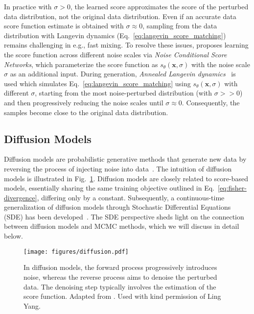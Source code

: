 In practice with $\sigma > 0$, the learned score approximates the score of the perturbed data distribution, not the original data distribution. Even if an accurate data score function estimate is obtained with $\sigma \approx 0$, sampling from the data distribution with Langevin dynamics (Eq.~\eqref{eq:langevin_score_matching}) remains challenging in e.g., fast mixing. To resolve these issues, \citet{song2019generative} proposes learning the score function across different noise scales via \emph{Noise Conditional Score Networks}, which parameterize the score function as $s_{\theta}(\bm{x},\sigma)$ with the noise scale $\sigma$ as an additional input. During generation, 
\emph{Annealed Langevin dynamics}~\citep{song2019generative} is used which simulates Eq.~\eqref{eq:langevin_score_matching} using $s_{\theta}(\bm{x},\sigma)$ with different $\sigma$, starting from the most noise-perturbed distribution (with $\sigma >> 0$) and then progressively reducing the noise scales until $\sigma \approx 0$. Consequently, the samples become close to the original data distribution.


\subsection{Diffusion Models}
\label{sec:dgm_ddpm}
Diffusion models are probabilistic generative methods that generate new data by reversing the process of injecting noise into data~\citep{sohl2015deep,ho2020denoising}.
The intuition of diffusion models is illustrated in Fig.~\ref{fig:diffusion}.
Diffusion models are closely related to score-based models, essentially sharing the same training objective outlined in Eq.~\eqref{eq:fisher-divergence}, differing only by a constant. Subsequently, a continuous-time generalization of diffusion models through Stochastic Differential Equations (SDE) has been developed~\citep{song2020score}. The SDE perspective sheds light on the connection between diffusion models and MCMC methods, which we will discuss in detail below.   

\begin{figure}[t]
    \centering
    \texttt{[image: figures/diffusion.pdf]}
    \caption{In diffusion models, the forward process progressively introduces noise, whereas the reverse process aims to denoise the perturbed data. The denoising step typically involves the estimation of the score function. Adapted from
\citet{yang2022diffusion}. Used with kind permission of Ling Yang.}
    \label{fig:diffusion}
\end{figure}

